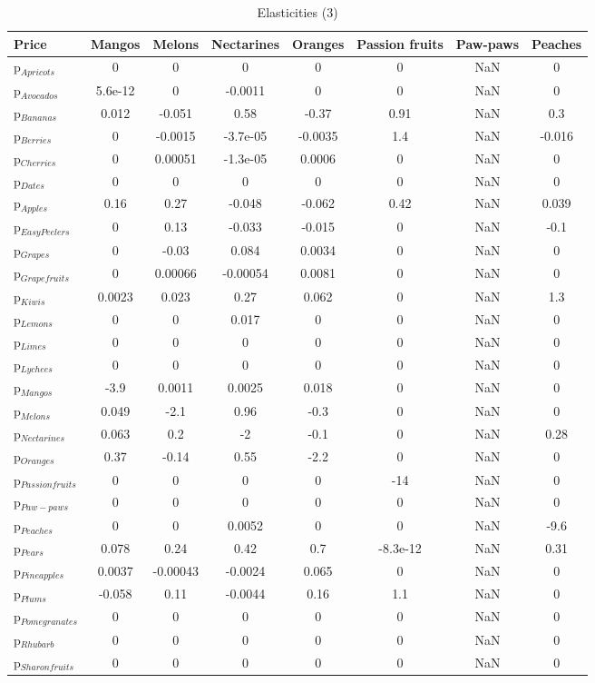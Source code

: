 \documentclass[11pt]{article}
\begin{document}
\begin{table}[h]
\caption{Elasticities (3)}
\label{Table: elasticities 3}
\begin{center}
\begin{tabular}{lccccccc} \hline \hline
Price &Mangos &Melons &Nectarines &Oranges &Passion fruits &Paw-paws &Peaches \\ \hline
p$_{Apricots}$ &0 &0 &0 &0 &0 &NaN &0 \\
p$_{Avocados}$ &5.6e-12 &0 &-0.0011 &0 &0 &NaN &0 \\
p$_{Bananas}$ &0.012 &-0.051 &0.58 &-0.37 &0.91 &NaN &0.3 \\
p$_{Berries}$ &0 &-0.0015 &-3.7e-05 &-0.0035 &1.4 &NaN &-0.016 \\
p$_{Cherries}$ &0 &0.00051 &-1.3e-05 &0.0006 &0 &NaN &0 \\
p$_{Dates}$ &0 &0 &0 &0 &0 &NaN &0 \\
p$_{Apples}$ &0.16 &0.27 &-0.048 &-0.062 &0.42 &NaN &0.039 \\
p$_{Easy Peelers}$ &0 &0.13 &-0.033 &-0.015 &0 &NaN &-0.1 \\
p$_{Grapes}$ &0 &-0.03 &0.084 &0.0034 &0 &NaN &0 \\
p$_{Grapefruits}$ &0 &0.00066 &-0.00054 &0.0081 &0 &NaN &0 \\
p$_{Kiwis}$ &0.0023 &0.023 &0.27 &0.062 &0 &NaN &1.3 \\
p$_{Lemons}$ &0 &0 &0.017 &0 &0 &NaN &0 \\
p$_{Limes}$ &0 &0 &0 &0 &0 &NaN &0 \\
p$_{Lychees}$ &0 &0 &0 &0 &0 &NaN &0 \\
p$_{Mangos}$ &-3.9 &0.0011 &0.0025 &0.018 &0 &NaN &0 \\
p$_{Melons}$ &0.049 &-2.1 &0.96 &-0.3 &0 &NaN &0 \\
p$_{Nectarines}$ &0.063 &0.2 &-2 &-0.1 &0 &NaN &0.28 \\
p$_{Oranges}$ &0.37 &-0.14 &0.55 &-2.2 &0 &NaN &0 \\
p$_{Passion fruits}$ &0 &0 &0 &0 &-14 &NaN &0 \\
p$_{Paw-paws}$ &0 &0 &0 &0 &0 &NaN &0 \\
p$_{Peaches}$ &0 &0 &0.0052 &0 &0 &NaN &-9.6 \\
p$_{Pears}$ &0.078 &0.24 &0.42 &0.7 &-8.3e-12 &NaN &0.31 \\
p$_{Pineapples}$ &0.0037 &-0.00043 &-0.0024 &0.065 &0 &NaN &0 \\
p$_{Plums}$ &-0.058 &0.11 &-0.0044 &0.16 &1.1 &NaN &0 \\
p$_{Pomegranates}$ &0 &0 &0 &0 &0 &NaN &0 \\
p$_{Rhubarb}$ &0 &0 &0 &0 &0 &NaN &0 \\
p$_{Sharon fruits}$ &0 &0 &0 &0 &0 &NaN &0 \\
\end{tabular}
\end{center}
\end{table}
\end{document}
